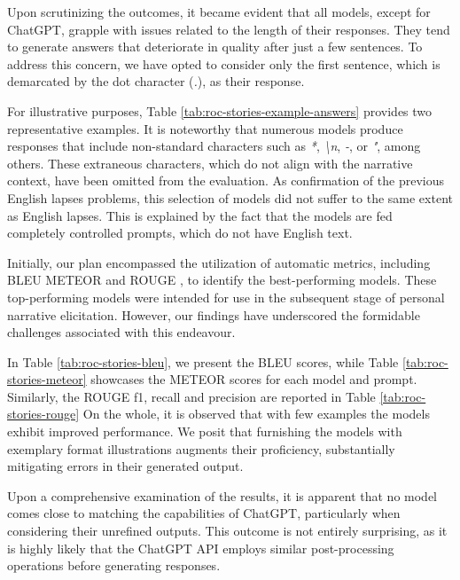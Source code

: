 \label{cha:methodology-LLMs-selection-story-cloze-test-results}
Upon scrutinizing the outcomes, it became evident that all models, except for ChatGPT, grapple with issues related to the length of their responses. They tend to generate answers that deteriorate in quality after just a few sentences. To address this concern, we have opted to consider only the first sentence, which is demarcated by the dot character (\emph{.}), as their response.

For illustrative purposes, Table \ref{tab:roc-stories-example-answers} provides two representative examples. It is noteworthy that numerous models produce responses that include non-standard characters such as \emph{*}, \emph{\textbackslash n}, \emph{-}, or \emph{"}, among others. These extraneous characters, which do not align with the narrative context, have been omitted from the evaluation. 
As confirmation of the previous English lapses problems, this selection of models did not suffer to the same extent as English lapses. This is explained by the fact that the models are fed completely controlled prompts, which do not have English text.

Initially, our plan encompassed the utilization of automatic metrics, including BLEU \cite{bleu} METEOR \cite{meteor} and ROUGE \cite{rouge}, to identify the best-performing models. These top-performing models were intended for use in the subsequent stage of personal narrative elicitation. However, our findings have underscored the formidable challenges associated with this endeavour.



In Table \ref{tab:roc-stories-bleu}, we present the BLEU scores, while Table \ref{tab:roc-stories-meteor} showcases the METEOR scores for each model and prompt. Similarly, the ROUGE f1, recall and precision are reported in Table \ref{tab:roc-stories-rouge} On the whole, it is observed that with few examples the models exhibit improved performance. We posit that furnishing the models with exemplary format illustrations augments their proficiency, substantially mitigating errors in their generated output.

Upon a comprehensive examination of the results, it is apparent that no model comes close to matching the capabilities of ChatGPT, particularly when considering their unrefined outputs. This outcome is not entirely surprising, as it is highly likely that the ChatGPT API employs similar post-processing operations before generating responses.

